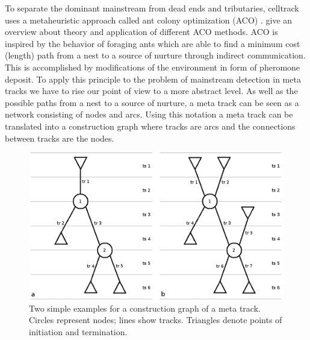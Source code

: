 \documentclass{scrartcl}
\begin{document}
To separate the dominant mainstream from dead ends and tributaries, celltrack uses a metaheuristic approach called ant colony optimization (ACO) \citep{Dor1992:thesis}. \cite{DorSta2004:book} give an overview about theory and application of different ACO methods. ACO is inspired by the behavior of foraging ants which are able to find a minimum cost (length) path from a nest to a source of nurture through indirect communication. This is accomplished by modifications of the environment in form of pheromone deposit. To apply this principle to the problem of mainstream detection in meta tracks we have to rise our point of view to a more abstract level. As well as the possible paths from a nest to a source of nurture, a meta track can be seen as a network consisting of nodes and arcs. Using this notation a meta track can be translated into a construction graph where tracks are arcs and the connections between tracks are the nodes.
\begin{figure}[h]
	\centering
	\includegraphics[width=.8\linewidth]{construction_graphs}
	\caption{Two simple examples for a construction graph of a meta track. Circles represent nodes; lines show tracks. Triangles denote points of initiation and termination.}
	\label{meta_track_con}
\end{figure}
\end{document}
